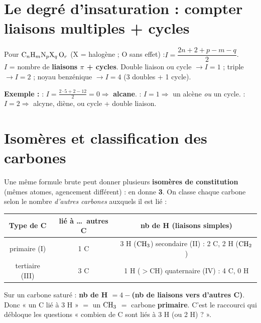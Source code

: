 \documentclass[11pt,a4paper]{article}
\begin{document}
\section{Le degré d'insaturation : compter liaisons multiples + cycles}
\begin{defn}
Pour $\ce{C_nH_mN_pX_q O_r}$ (X = halogène ; O sans effet) :\quad $I=\dfrac{2n+2+p-m-q}{2}$.\\
$I$ = nombre de \textbf{liaisons $\pi$ + cycles}. Double liaison ou cycle $\to I{=}1$ ; triple $\to I{=}2$ ; noyau benzénique $\to I{=}4$ (3 doubles + 1 cycle).
\end{defn}
\textbf{Exemple :}  : $I=\frac{2\cdot5+2-12}{2}=0 \Rightarrow$ \textbf{alcane}.\quad {} : $I=1 \Rightarrow$ un alcène \emph{ou} un cycle.\quad {} : $I=2 \Rightarrow$ alcyne, diène, ou cycle + double liaison.

\section{Isomères et classification des carbones}
Une même formule brute peut donner plusieurs \textbf{isomères de constitution} (mêmes atomes, agencement différent) :  en donne \textbf{3}. On classe chaque carbone selon le nombre \emph{d'autres carbones} auxquels il est lié :

\begin{center}\renewcommand{\arraystretch}{1.05}\small
\begin{tabular}{c c c}
\toprule
\textbf{Type de C} & lié à \dots\ autres C & nb de H (liaisons simples) \\
\midrule
primaire (I) & 1 C & 3 H ($\ce{CH3}$) \qquad secondaire (II) : 2 C, 2 H ($\ce{CH2}$) \\
tertiaire (III) & 3 C & 1 H ($>$CH) \qquad quaternaire (IV) : 4 C, 0 H \\
\bottomrule
\end{tabular}
\end{center}

\begin{astuce}
Sur un carbone saturé : \textbf{nb de H $=4-$(nb de liaisons vers d'autres C)}. Donc « un C lié à 3 H » $=$ un $\ce{CH3}$ $=$ carbone \textbf{primaire}. C'est le raccourci qui débloque les questions « combien de C sont liés à 3 H (ou 2 H) ? ».
\end{astuce}
\end{document}
